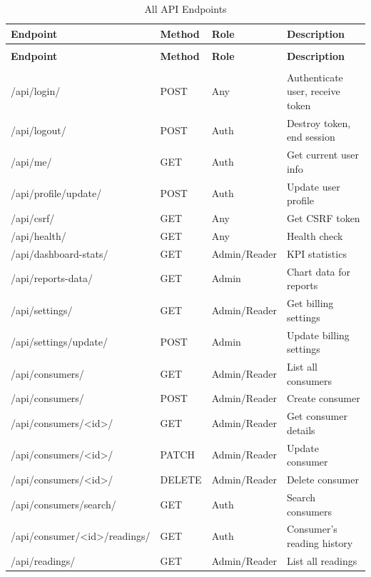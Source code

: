 \documentclass[12pt, a4paper]{report}
\begin{document}
\begin{longtable}{>{\ttfamily}p{} p{} p{} p{}}
\caption{All API Endpoints} \\
\toprule
\textbf{Endpoint} & \textbf{Method} & \textbf{Role} & \textbf{Description} \\
\midrule
\endfirsthead
\multicolumn{4}{c}{\textit{Table continued\ldots}} \\
\toprule
\textbf{Endpoint} & \textbf{Method} & \textbf{Role} & \textbf{Description} \\
\midrule
\endhead
\midrule \multicolumn{4}{r}{\textit{Continued on next page}} \\
\endfoot
\bottomrule
\endlastfoot

/api/login/ & POST & Any & Authenticate user, receive token \\
/api/logout/ & POST & Auth & Destroy token, end session \\
/api/me/ & GET & Auth & Get current user info \\
/api/profile/update/ & POST & Auth & Update user profile \\
/api/csrf/ & GET & Any & Get CSRF token \\
/api/health/ & GET & Any & Health check \\
\midrule
/api/dashboard-stats/ & GET & Admin/Reader & KPI statistics \\
/api/reports-data/ & GET & Admin & Chart data for reports \\
/api/settings/ & GET & Admin/Reader & Get billing settings \\
/api/settings/update/ & POST & Admin & Update billing settings \\
\midrule
/api/consumers/ & GET & Admin/Reader & List all consumers \\
/api/consumers/ & POST & Admin/Reader & Create consumer \\
/api/consumers/<id>/ & GET & Admin/Reader & Get consumer details \\
/api/consumers/<id>/ & PATCH & Admin/Reader & Update consumer \\
/api/consumers/<id>/ & DELETE & Admin/Reader & Delete consumer \\
/api/consumers/search/ & GET & Auth & Search consumers \\
/api/consumer/<id>/readings/ & GET & Auth & Consumer's reading history \\
\midrule
/api/readings/ & GET & Admin/Reader & List all readings \\

\end{longtable}
\end{document}
